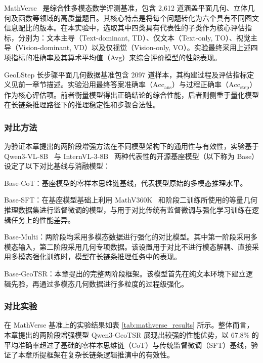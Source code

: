 MathVerse~\cite{zhang2024mathverse} 是综合性多模态数学评测基准，包含 2,612 道涵盖平面几何、立体几何及函数等领域的高质量题目。其核心特点是将每个问题转化为六个具有不同图文信息配比的版本。在本实验中，选取其中四类具有代表性的子类作为核心评估指标，分别为：文本主导（Text-dominant, TD）、仅文本（Text-only, TO）、视觉主导（Vision-dominant, VD）以及仅视觉（Vision-only, VO）。实验最终采用上述四项指标的准确率及其算术平均值（Avg）来综合评价模型的性能表现。

GeoLStep 长步骤平面几何数据基准包含 2097 道样本，其构建过程及评估指标定义见前一章节描述。实验沿用最终答案准确率（$\mathrm{Acc}_{\text{ans}}$）与过程正确率（$\mathrm{Acc}_{\text{step}}$）作为核心评估项。前者衡量模型得出正确结论的综合性能，后者则侧重于量化模型在长链条推理路径下的推理稳定性和步骤合法性。

\subsubsection{对比方法}

为验证本章提出的两阶段增强方法在不同模型架构下的通用性与有效性，实验基于 Qwen3-VL-8B~\cite{bai2025qwen3vl} 与 InternVL-3-8B~\cite{zhu2025internvl3} 两种代表性的开源基座模型（以下称为 Base）设定了以下对比基线与消融模型：

Base-CoT：基座模型的零样本思维链基线，代表模型原始的多模态推理水平。

Base-SFT：在基座模型基础上利用 MathV360K~\cite{shi2024mathllava} 和阶段二训练所使用的等量几何推理数据集进行监督微调的模型，与用于对比传统有监督微调与强化学习训练在逻辑任务上的性能差异。

Base-Multi：两阶段均采用多模态数据进行强化的对比模型。其中第一阶段采用多模态输入，第二阶段采用几何专项数据。该设置用于对比不进行模态解耦、直接采用多模态强化训练时，模型在长链条推理任务中的表现。

Base-GeoTSR：本章提出的完整两阶段框架。该模型首先在纯文本环境下建立逻辑先验，再通过多模态几何数据进行多粒度的过程级强化。



\subsubsection{对比实验}
在 MathVerse 基准上的实验结果如表 \ref{tab:mathverse_results} 所示。整体而言，本章提出的两阶段增强模型 Qwen3-GeoTSR 展现出较强的性能优势，以 67.8\% 的平均准确率超过了基础的零样本思维链（CoT）与传统监督微调（SFT）基线，验证了本章所提框架在复杂长链条逻辑推演中的有效性。

